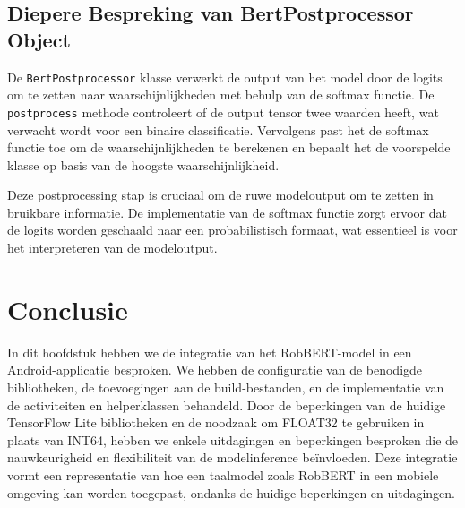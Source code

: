 \subsection{Diepere Bespreking van BertPostprocessor Object}

De \texttt{BertPostprocessor} klasse verwerkt de output van het model door de logits om te zetten naar waarschijnlijkheden met behulp van de softmax functie. De \texttt{postprocess} methode controleert of de output tensor twee waarden heeft, wat verwacht wordt voor een binaire classificatie. Vervolgens past het de softmax functie toe om de waarschijnlijkheden te berekenen en bepaalt het de voorspelde klasse op basis van de hoogste waarschijnlijkheid.

Deze postprocessing stap is cruciaal om de ruwe modeloutput om te zetten in bruikbare informatie. De implementatie van de softmax functie zorgt ervoor dat de logits worden geschaald naar een probabilistisch formaat, wat essentieel is voor het interpreteren van de modeloutput.

\section{Conclusie}

In dit hoofdstuk hebben we de integratie van het RobBERT-model in een Android-applicatie besproken. We hebben de configuratie van de benodigde bibliotheken, de toevoegingen aan de build-bestanden, en de implementatie van de activiteiten en helperklassen behandeld. Door de beperkingen van de huidige TensorFlow Lite bibliotheken en de noodzaak om FLOAT32 te gebruiken in plaats van INT64, hebben we enkele uitdagingen en beperkingen besproken die de nauwkeurigheid en flexibiliteit van de modelinference beïnvloeden. Deze integratie vormt een representatie van hoe een taalmodel zoals RobBERT in een mobiele omgeving kan worden toegepast, ondanks de huidige beperkingen en uitdagingen.